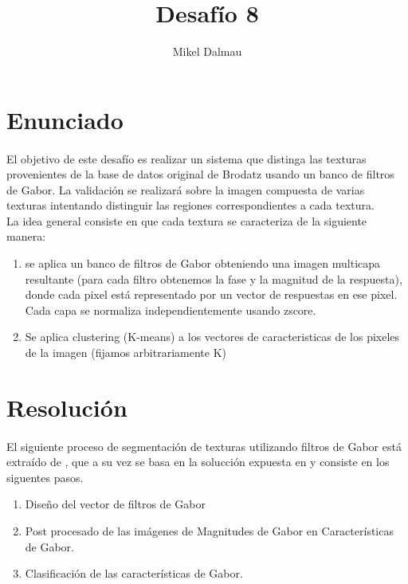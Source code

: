 \documentclass[es,gi]{ifirak}\usepackage[]{graphicx}\usepackage[]{color}
\begin{document}
\title{Desafío 8}
\author{Mikel Dalmau}

\maketitle




\tableofcontents

\section{Enunciado}
\paragraph{}El objetivo de este desafío es realizar un sistema que distinga las texturas provenientes de la base de datos original de Brodatz usando un banco de filtros de Gabor. La validación se realizará sobre la imagen compuesta de varias texturas intentando distinguir las regiones correspondientes a cada textura.\\

La idea general consiste en que cada textura se caracteriza de la siguiente manera:
\begin{enumerate}
\item se aplica un banco de filtros de Gabor obteniendo una imagen multicapa resultante (para cada filtro obtenemos la fase y la magnitud de la respuesta), donde cada pixel está representado por un vector de respuestas en ese pixel.  Cada capa se normaliza independientemente usando zscore.

\item Se aplica clustering (K-means) a los vectores de caracteristicas de los pixeles de la imagen (fijamos arbitrariamente K)

\end{enumerate}

\section{Resolución}
\paragraph{} El siguiente proceso de segmentación de texturas utilizando filtros de Gabor está extraído de \cite{key-1}, que a su vez se basa en la solucción expuesta en \cite{key-3} y consiste en los siguentes pasos.
\begin{enumerate}
\item Diseño del vector de filtros de Gabor
\item Post procesado de las imágenes de Magnitudes de Gabor en Características de Gabor.
\item Clasificación de las características de Gabor.
\end{enumerate}
\end{document}
